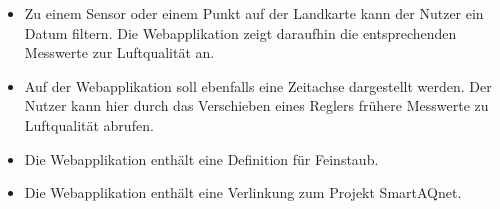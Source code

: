 \begin{itemize}
	\item Zu einem \gls{Sensor} oder einem Punkt auf der Landkarte kann der Nutzer ein Datum filtern. 
	Die Webapplikation zeigt daraufhin die entsprechenden Messwerte zur Luftqualität an.

	\item Auf der Webapplikation soll ebenfalls eine Zeitachse dargestellt werden. 
	Der Nutzer kann hier durch das Verschieben eines Reglers frühere Messwerte zu Luftqualität abrufen. 

	\item Die Webapplikation enthält eine Definition für \gls{Feinstaub}.

	\item Die Webapplikation enthält eine Verlinkung zum Projekt SmartAQnet. 
\end{itemize}

